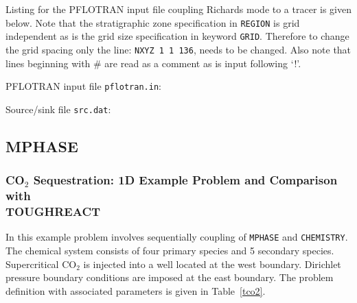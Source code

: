 Listing for the PFLOTRAN input file coupling Richards mode to a tracer is given below. Note that the stratigraphic zone specification in {\tt REGION} is grid independent as is the grid size specification in keyword {\tt GRID}. Therefore to change the grid spacing only the line: {\tt NXYZ 1 1 136}, needs to be changed. Also note that lines beginning with \# are read as a comment as is input following `!'.

\bigskip

\noindent PFLOTRAN input file {\tt pflotran.in}: 
\scriptsize


\clearpage

\normalsize
\noindent
Source/sink file {\tt src.dat}:
\scriptsize
{}
\normalsize

\subsection{MPHASE}

\subsubsection{CO$_2$ Sequestration: 1D Example Problem and Comparison with\\ TOUGHREACT}

In this example problem involves sequentially coupling of {\tt MPHASE} and {\tt CHEMISTRY}. The chemical system consists of four primary species and 5 secondary species. Supercritical CO$_2$ is injected into a well located at the west boundary. Dirichlet pressure boundary conditions are imposed at the east boundary. The problem definition with associated parameters is given in Table~\ref{tco2}.

